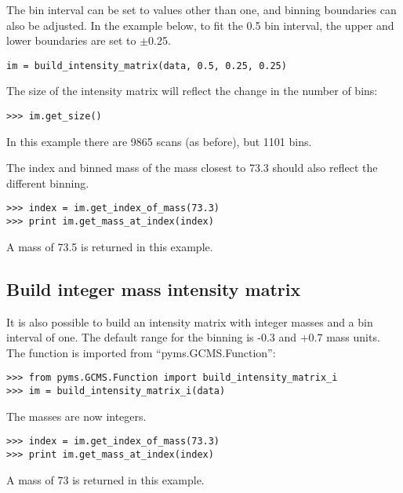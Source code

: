 
The bin interval can be set to values other than one, and binning boundaries
can also be adjusted. In the example below, to fit the 0.5 bin interval, the
upper and lower boundaries are set to $\pm$0.25.

\begin{verbatim}
im = build_intensity_matrix(data, 0.5, 0.25, 0.25)
\end{verbatim}

The size of the intensity matrix will reflect the change in the number of bins:

\begin{verbatim}
>>> im.get_size()
\end{verbatim}

In this example there are 9865 scans (as before), but 1101 bins.

The index and binned mass of the mass closest to 73.3 should also reflect the
different binning.

\begin{verbatim}
>>> index = im.get_index_of_mass(73.3)
>>> print im.get_mass_at_index(index)
\end{verbatim}

A mass of 73.5 is returned in this example.

\subsection{Build integer mass intensity matrix}


It is also possible to build an intensity matrix with integer masses and a bin
interval of one. The default range for the binning is -0.3 and +0.7 mass
units. The function is imported from ``pyms.GCMS.Function'':

\begin{verbatim}
>>> from pyms.GCMS.Function import build_intensity_matrix_i
>>> im = build_intensity_matrix_i(data)
\end{verbatim}

The masses are now integers.

\begin{verbatim}
>>> index = im.get_index_of_mass(73.3)
>>> print im.get_mass_at_index(index)
\end{verbatim}

A mass of 73 is returned in this example.


